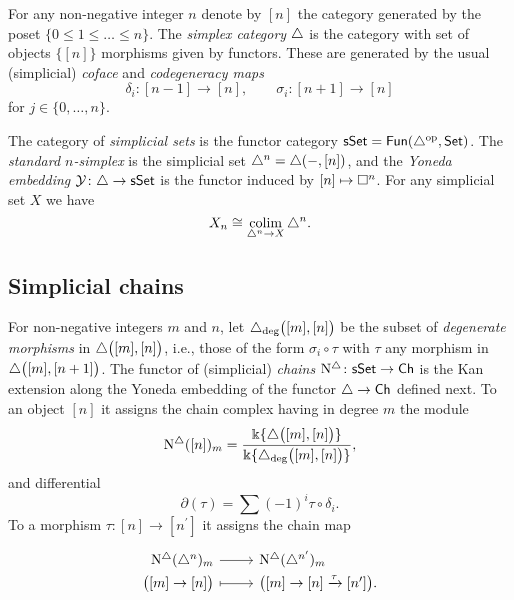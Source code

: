 For any non-negative integer $n$ denote by $[n]$ the category generated by the poset $\{0 \leq 1 \leq \dots \leq n\}$.
The \textit{simplex category} $\triangle$ is the category with set of objects $\big\{ [n] \big\}$ morphisms given by functors.
These are generated by the usual (simplicial) \textit{coface} and \textit{codegeneracy maps}
\begin{equation*}
\delta_i \colon [n-1] \to [n], \qquad \sigma_i \colon [n+1] \to [n]
\end{equation*}
for $j \in \{0, \dots, n\}$.

The category of \textit{simplicial sets} is the functor category $\mathsf{sSet} = \mathsf{Fun}(\triangle^{\mathrm{op}}, \mathsf{Set})$.
The \textit{standard $n$-simplex} is the simplicial set $\triangle^n = \triangle(-, [n])$, and the \textit{Yoneda embedding} $\operatorname{\mathcal{Y}} \colon \triangle \to \mathsf{sSet}$ is the functor induced by $[n] \mapsto \square^n$.
For any simplicial set $X$ we have
\begin{equation*}
X_n \cong \operatorname*{colim}_{\triangle^n \to X} \triangle^n.
\end{equation*}

\subsection{Simplicial chains}

For non-negative integers $m$ and $n$, let $\triangle_{\deg} \big( [m], [n] \big)$ be the subset of \textit{degenerate morphisms} in $\triangle \big( [m], [n] \big)$, i.e., those of the form $\sigma_i \circ \tau$ with $\tau$ any morphism in $\triangle \big( [m], [n+1] \big)$.
The functor of (simplicial) \textit{chains} $\operatorname{N^{\triangle}} \colon \mathsf{sSet} \to \mathsf{Ch}$ is the Kan extension along the Yoneda embedding of the functor $\triangle \to \mathsf{Ch}$ defined next.
To an object $[n]$ it assigns the chain complex having in degree $m$ the module
\begin{equation*}
\operatorname{N^{\triangle}}([n])_m = \frac{\Bbbk\{\triangle \big( [m], [n] \big) \}}{\Bbbk\{\triangle_{\deg} \big( [m], [n] \big) \}},
\end{equation*}
and differential
\begin{equation*}
\partial(\tau) = \sum (-1)^i \tau \circ \delta_i.
\end{equation*}
To a morphism $\tau \colon [n] \to [n^\prime]$ it assigns the chain map
\begin{equation*}
\begin{tikzcd}[row sep=-3pt, column sep=normal,
/tikz/column 1/.append style={anchor=base east},
/tikz/column 2/.append style={anchor=base west}]
\schains(\simplex^n)_m \arrow[r] &  \schains(\simplex^{n^\prime})_m \\
\big( [m] \to [n] \big) \arrow[r, mapsto] & \big( [m] \to [n] \xra{\tau} [n^\prime] \big).
\end{tikzcd}
\end{equation*}


